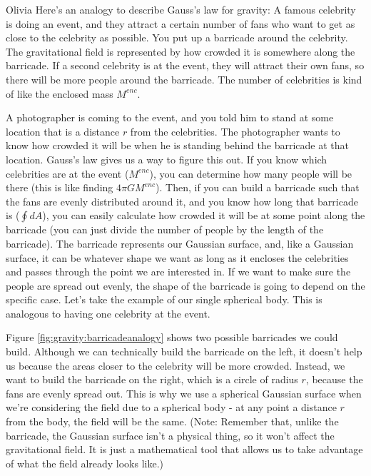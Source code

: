 \begin{studentOpinion}{Olivia} Here's an analogy to describe Gauss's law for gravity: A famous celebrity is doing an event, and they attract a certain number of fans who want to get as close to the celebrity as possible. You put up a barricade around the celebrity. The gravitational field is represented by how crowded it is somewhere along the barricade. If a second celebrity is at the event, they will attract their own fans, so there will be more people around the barricade. The number of celebrities is kind of like the enclosed mass $M^{enc}$. 

A photographer is coming to the event, and you told him to stand at some location that is a distance $r$ from the celebrities. The photographer wants to know how crowded it will be when he is standing behind the barricade at that location. Gauss's law gives us a way to figure this out. If you know which celebrities are at the event ($M^{enc}$), you can determine how many people will be there (this is like finding $4\pi GM^{enc}$). Then, if you can build a barricade such that the fans are evenly distributed around it, and you know how long that barricade is ($\oint dA$), you can easily calculate how crowded it will be at some point along the barricade (you can just divide the number of people by the length of the barricade). 
\newpage
The barricade represents our Gaussian surface, and, like a Gaussian surface, it can be whatever shape we want as long as it encloses the celebrities and passes through the point we are interested in. If we want to make sure the people are spread out evenly, the shape of the barricade is going to depend on the specific case. Let's take the example of our single spherical body. This is analogous to having one celebrity at the event.

Figure \ref{fig:gravity:barricadeanalogy} shows two possible barricades we could build. Although we can technically build the barricade on the left, it doesn't help us because the areas closer to the celebrity will be more crowded. Instead, we want to build the barricade on the right, which is a circle of radius $r$, because the fans are evenly spread out. This is why we use a spherical Gaussian surface when we're considering the field due to a spherical body - at any point a distance $r$ from the body, the field will be the same. (Note: Remember that, unlike the barricade, the Gaussian surface isn't a physical thing, so it won't affect the gravitational field. It is just a mathematical tool that allows us to take advantage of what the field already looks like.)
\end{studentOpinion}

